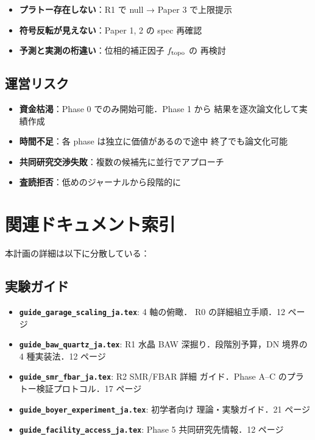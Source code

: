 \documentclass[11pt,a4paper]{article}
\begin{document}
\begin{itemize}
\item \textbf{プラトー存在しない}：R1 で null → Paper 3 で上限提示
\item \textbf{符号反転が見えない}：Paper 1, 2 の spec 再確認
\item \textbf{予測と実測の桁違い}：位相的補正因子 $f_{\rm topo}$ の
再検討
\end{itemize}

\subsection{運営リスク}

\begin{itemize}
\item \textbf{資金枯渇}：Phase 0 でのみ開始可能．Phase 1 から
結果を逐次論文化して実績作成
\item \textbf{時間不足}：各 phase は独立に価値があるので途中
終了でも論文化可能
\item \textbf{共同研究交渉失敗}：複数の候補先に並行でアプローチ
\item \textbf{査読拒否}：低めのジャーナルから段階的に
\end{itemize}

\section{関連ドキュメント索引}

本計画の詳細は以下に分散している：

\subsection{実験ガイド}

\begin{itemize}
\item \textbf{\texttt{guide\_garage\_scaling\_ja.tex}}: 4 軸の俯瞰．
R0 の詳細組立手順．12 ページ
\item \textbf{\texttt{guide\_baw\_quartz\_ja.tex}}: R1 水晶 BAW
深掘り．段階別予算，DN 境界の 4 種実装法．12 ページ
\item \textbf{\texttt{guide\_smr\_fbar\_ja.tex}}: R2 SMR/FBAR 詳細
ガイド．Phase A--C のプラトー検証プロトコル．17 ページ
\item \textbf{\texttt{guide\_boyer\_experiment\_ja.tex}}: 初学者向け
理論・実験ガイド．21 ページ
\item \textbf{\texttt{guide\_facility\_access\_ja.tex}}: Phase 5
共同研究先情報．12 ページ
\end{itemize}
\end{document}

